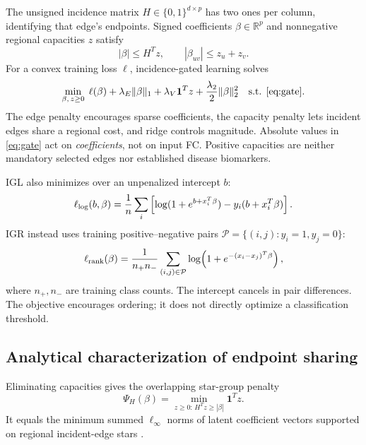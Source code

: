 \documentclass{article}
\newcommand{\R}{\mathbb{R}}
\newcommand{\one}{\mathbf{1}}
\begin{document}
The unsigned incidence matrix $H\in\{0,1\}^{d\times p}$ has two ones per column, identifying that edge's endpoints. Signed coefficients $\beta\in\R^p$ and nonnegative regional capacities $z$ satisfy
\begin{equation}
 |\beta|\le H^Tz,\qquad |\beta_{uv}|\le z_u+z_v.
 \label{eq:gate}
\end{equation}
For a convex training loss $\ell$, incidence-gated learning solves
\begin{equation}
 \min_{\beta,\,z\ge0}\;
 \ell(\beta)+\lambda_E\|\beta\|_1+\lambda_V\one^Tz
                  +\frac{\lambda_2}{2}\|\beta\|_2^2
 \quad\text{s.t. }\eqref{eq:gate}.
 \label{eq:objective}
\end{equation}
The edge penalty encourages sparse coefficients, the capacity penalty lets incident edges share a regional cost, and ridge controls magnitude. Absolute values in \eqref{eq:gate} act on \emph{coefficients}, not on input FC. Positive capacities are neither mandatory selected edges nor established disease biomarkers.

IGL also minimizes over an unpenalized intercept $b$:
\begin{equation}
 \ell_{\rm log}(b,\beta)=\frac1n\sum_i
 \left[\log(1+e^{b+x_i^T\beta})-y_i(b+x_i^T\beta)\right].
 \label{eq:logistic}
\end{equation}
IGR instead uses training positive--negative pairs $\mathcal P=\{(i,j):y_i=1,y_j=0\}$:
\begin{equation}
 \ell_{\rm rank}(\beta)=\frac1{n_+n_-}
 \sum_{(i,j)\in\mathcal P}\log\!\left(1+e^{-(x_i-x_j)^T\beta}\right),
 \label{eq:ranking}
\end{equation}
where $n_+,n_-$ are training class counts. The intercept cancels in pair differences. The objective encourages ordering; it does not directly optimize a classification threshold.

\subsection{Analytical characterization of endpoint sharing}
Eliminating capacities gives the overlapping star-group penalty
\begin{equation}
 \Psi_H(\beta)=\min_{z\ge0:\,H^Tz\ge|\beta|}\one^Tz.
 \label{eq:capacity}
\end{equation}
It equals the minimum summed $\ell_\infty$ norms of latent coefficient vectors supported on regional incident-edge stars \cite{latent}.
\end{document}
